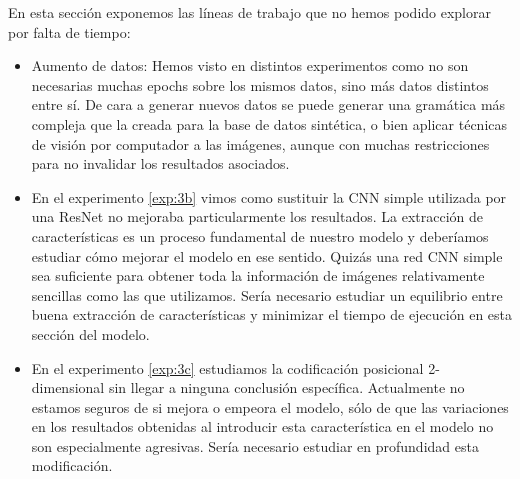 \documentclass[a4paper, 20pt, dvipsnames]{article}
\begin{document}
En esta sección exponemos las líneas de trabajo que no hemos podido explorar
por falta de tiempo:

\begin{itemize}
\item
	Aumento de datos: Hemos visto en distintos experimentos como no son
	necesarias muchas epochs sobre los mismos datos, sino más datos distintos
	entre sí. De cara a generar nuevos datos se puede generar una gramática más
	compleja que la creada para la base de datos sintética, o bien aplicar
	técnicas de visión por computador a las imágenes, aunque con muchas
	restricciones para no invalidar los resultados asociados.
	
\item
	En el experimento \ref{exp:3b} vimos como sustituir la CNN simple utilizada
	por una ResNet no mejoraba particularmente los resultados. La extracción
	de características es un proceso fundamental de nuestro modelo y deberíamos
	estudiar cómo mejorar el modelo en ese sentido. Quizás una red CNN simple
	sea suficiente para obtener toda la información de imágenes relativamente
	sencillas como las que utilizamos. Sería necesario estudiar un equilibrio
	entre buena extracción de características y minimizar el tiempo de ejecución
	en esta sección del modelo.
	
\item
	En el experimento \ref{exp:3c} estudiamos la codificación posicional
	2-dimensional sin llegar a ninguna conclusión específica. Actualmente
	no estamos seguros de si mejora o empeora el modelo, sólo de que las
	variaciones en los resultados obtenidas al introducir esta característica
	en el modelo no son especialmente agresivas. Sería necesario estudiar en
	profundidad esta modificación.
\end{itemize}


\printbibliography
\end{document}
